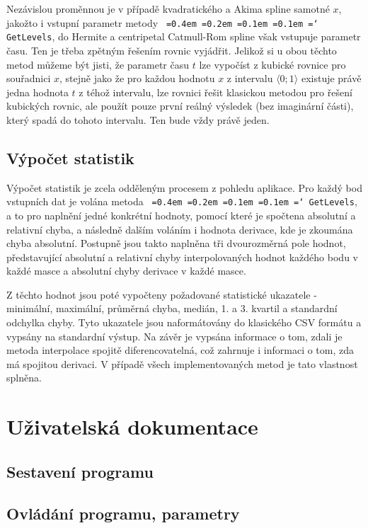 \documentclass[]{thesiskiv}
\newcommand*\justify{
  \fontdimen2\font=0.4em
  \fontdimen3\font=0.2em
  \fontdimen4\font=0.1em
  \fontdimen7\font=0.1em
  \hyphenchar\font=`\-
}
\begin{document}
Nezávislou proměnnou je v případě kvadratického a Akima spline samotné $x$, jakožto i vstupní parametr metody \texttt{\justify GetLevels}, do Hermite a centripetal Catmull-Rom spline však vstupuje parametr času. Ten je třeba zpětným řešením rovnic vyjádřit. Jelikož si u obou těchto metod můžeme být jisti, že parametr času $t$ lze vypočíst z kubické rovnice pro souřadnici $x$, stejně jako že pro každou hodnotu $x$ z intervalu $\langle 0 ; 1 \rangle$ existuje právě jedna hodnota $t$ z téhož intervalu, lze rovnici řešit klasickou metodou pro řešení kubických rovnic, ale použít pouze první reálný výsledek (bez imaginární části), který spadá do tohoto intervalu. Ten bude vždy právě jeden.

\section{Výpočet statistik}

Výpočet statistik je zcela odděleným procesem z pohledu aplikace. Pro každý bod vstupních dat je volána metoda \texttt{\justify GetLevels}, a to pro naplnění jedné konkrétní hodnoty, pomocí které je spočtena absolutní a relativní chyba, a následně dalším voláním i hodnota derivace, kde je zkoumána chyba absolutní. Postupně jsou takto naplněna tři dvourozměrná pole hodnot, představující absolutní a relativní chyby interpolovaných hodnot každého bodu v každé masce a absolutní chyby derivace v každé masce.

Z těchto hodnot jsou poté vypočteny požadované statistické ukazatele - minimální, maximální, průměrná chyba, medián, 1. a 3. kvartil a standardní odchylka chyby. Tyto ukazatele jsou naformátovány do klasického CSV formátu a vypsány na standardní výstup. Na závěr je vypsána informace o tom, zdali je metoda interpolace spojitě diferencovatelná, což zahrnuje i informaci o tom, zda má spojitou derivaci. V případě všech implementovaných metod je tato vlastnost splněna.

\chapter{Uživatelská dokumentace}

\section{Sestavení programu}

\section{Ovládání programu, parametry}
\end{document}
